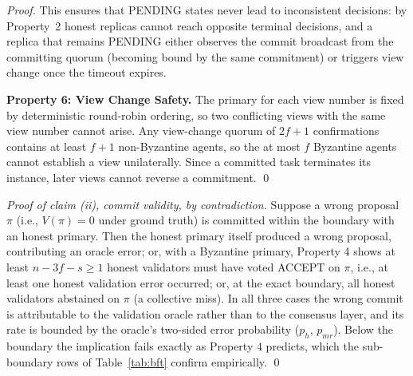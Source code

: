 \documentclass{article}
\begin{document}
\begin{proof}
This ensures that PENDING states never lead to inconsistent decisions: by Property~2 honest replicas cannot reach opposite terminal decisions, and a replica that remains PENDING either observes the commit broadcast from the committing quorum (becoming bound by the same commitment) or triggers view change once the timeout expires.

\textbf{Property 6: View Change Safety.}
The primary for each view number is fixed by deterministic round-robin ordering, so two conflicting views with the same view number cannot arise. Any view-change quorum of $2f+1$ confirmations contains at least $f+1$ non-Byzantine agents, so the at most $f$ Byzantine agents cannot establish a view unilaterally. Since a committed task terminates its instance, later views cannot reverse a commitment. \qed
\end{proof}

\begin{proof}[Proof of claim (ii), commit validity, by contradiction]
Suppose a wrong proposal $\pi$ (i.e., $V(\pi)=0$ under ground truth) is committed within the boundary with an honest primary. Then the honest primary itself produced a wrong proposal, contributing an oracle error; or, with a Byzantine primary, Property 4 shows at least $n-3f-s \geq 1$ honest validators must have voted ACCEPT on $\pi$, i.e., at least one honest validation error occurred; or, at the exact boundary, all honest validators abstained on $\pi$ (a collective miss). In all three cases the wrong commit is attributable to the validation oracle rather than to the consensus layer, and its rate is bounded by the oracle's two-sided error probability ($p_h$, $p_{\mathit{mr}}$). Below the boundary the implication fails exactly as Property 4 predicts, which the sub-boundary rows of Table~\ref{tab:bft} confirm empirically. \qed
\end{proof}
\end{document}
